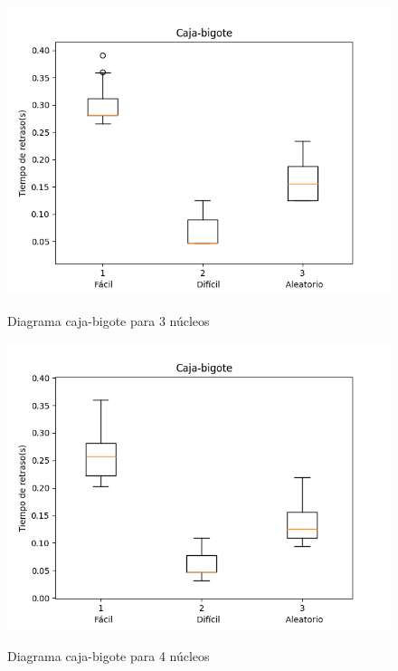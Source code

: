 \documentclass[a4paper, 11pt]{article}
\begin{document}
\begin{figure}[H]
  \centering      
  \caption{Diagrama caja-bigote para 3 núcleos}  
  \includegraphics[scale=.6]{CB_3núcleos.png}
  \label{f3}
\end{figure}
\begin{figure}[H]
  \centering      
  \caption{Diagrama caja-bigote para 4 núcleos}  
  \includegraphics[scale=.6]{CB_4núcleos.png}
  \label{f4}
\end{figure}
\end{document}

